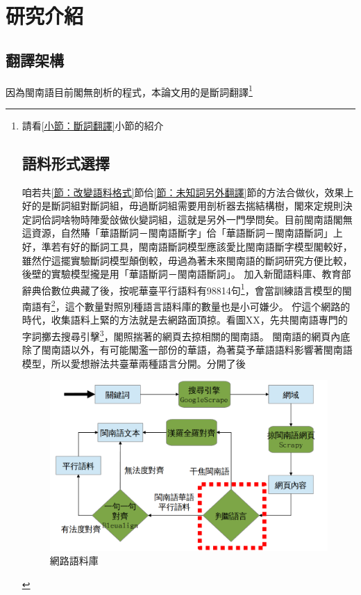
\chapter{研究介紹}
\label{章：研究介紹}

\section{翻譯架構}
\label{節：翻譯架構}
因為閩南語目前閣無剖析的程式，本論文用的是斷詞翻譯\footnote{請看\ref{小節：斷詞翻譯}小節的紹介

\section{語料形式選擇}
\label{節：語料形式選擇}
咱若共\ref{節：改變語料格式}節佮\ref{節：未知詞另外翻譯}節的方法合做伙，效果上好的是斷詞組對斷詞組，毋過斷詞組需要用剖析器去揣結構樹，閣來定規則決定詞佮詞啥物時陣愛敆做伙變詞組，這就是另外一門學問矣。目前閩南語閣無這資源，自然賰「華語斷詞－閩南語斷字」佮「華語斷詞－閩南語斷詞」上好，準若有好的斷詞工具，閩南語斷詞模型應該愛比閩南語斷字模型閣較好，雖然佇這擺實驗斷詞模型顛倒較，毋過為著未來閩南語的斷詞研究方便比較，後壁的實驗模型攏是用「華語斷詞－閩南語斷詞」。
加入新聞語料庫、教育部辭典佮數位典藏了後，按呢華臺平行語料有98814句\footnote{新聞語料庫64121句，教育部辭典34693句}，會當訓練語言模型的閩南語有\footnote{新聞語料庫64121句，教育部辭典例句34693句、附錄句388句，數位典藏416343句}，這个數量對照別種語言語料庫的數量也是小可嫌少。
佇這个網路的時代，收集語料上緊的方法就是去網路面頂掠。看圖XX，先共閩南語專門的字詞擲去搜尋引擊\footnote{親像Google、Bing}，閣照揣著的網頁去掠相關的閩南語。
閩南語的網頁內底除了閩南語以外，有可能閣濫一部份的華語，為著莫予華語語料影響著閩南語模型，所以愛想辦法共臺華兩種語言分開。分開了後


\begin{figure}
\centerline{\includegraphics[keepaspectratio]{圖/網路語料庫結構}}
\caption{網路語料庫}
\label{圖：網路語料庫結構}
\end{figure}


}
